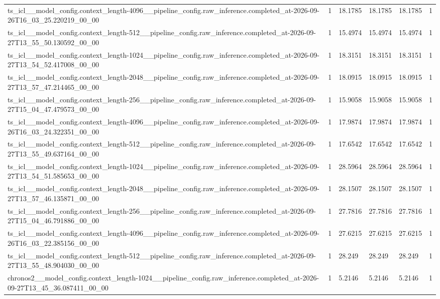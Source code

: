\begin{tabular}{llllll}
ts\_icl\_\_model\_config.context\_length-4096\_\_pipeline\_config.raw\_inference.completed\_at-2026-09-26T16\_03\_25.220219\_00\_00 & 1 & 18.1785 & 18.1785 & 18.1785 & 1 \\
ts\_icl\_\_model\_config.context\_length-512\_\_pipeline\_config.raw\_inference.completed\_at-2026-09-27T13\_55\_50.130592\_00\_00 & 1 & 15.4974 & 15.4974 & 15.4974 & 1 \\
ts\_icl\_\_model\_config.context\_length-1024\_\_pipeline\_config.raw\_inference.completed\_at-2026-09-27T13\_54\_52.417008\_00\_00 & 1 & 18.3151 & 18.3151 & 18.3151 & 1 \\
ts\_icl\_\_model\_config.context\_length-2048\_\_pipeline\_config.raw\_inference.completed\_at-2026-09-27T13\_57\_47.214465\_00\_00 & 1 & 18.0915 & 18.0915 & 18.0915 & 1 \\
ts\_icl\_\_model\_config.context\_length-256\_\_pipeline\_config.raw\_inference.completed\_at-2026-09-27T15\_04\_47.479573\_00\_00 & 1 & 15.9058 & 15.9058 & 15.9058 & 1 \\
ts\_icl\_\_model\_config.context\_length-4096\_\_pipeline\_config.raw\_inference.completed\_at-2026-09-26T16\_03\_24.322351\_00\_00 & 1 & 17.9874 & 17.9874 & 17.9874 & 1 \\
ts\_icl\_\_model\_config.context\_length-512\_\_pipeline\_config.raw\_inference.completed\_at-2026-09-27T13\_55\_49.637164\_00\_00 & 1 & 17.6542 & 17.6542 & 17.6542 & 1 \\
ts\_icl\_\_model\_config.context\_length-1024\_\_pipeline\_config.raw\_inference.completed\_at-2026-09-27T13\_54\_51.585653\_00\_00 & 1 & 28.5964 & 28.5964 & 28.5964 & 1 \\
ts\_icl\_\_model\_config.context\_length-2048\_\_pipeline\_config.raw\_inference.completed\_at-2026-09-27T13\_57\_46.135871\_00\_00 & 1 & 28.1507 & 28.1507 & 28.1507 & 1 \\
ts\_icl\_\_model\_config.context\_length-256\_\_pipeline\_config.raw\_inference.completed\_at-2026-09-27T15\_04\_46.791886\_00\_00 & 1 & 27.7816 & 27.7816 & 27.7816 & 1 \\
ts\_icl\_\_model\_config.context\_length-4096\_\_pipeline\_config.raw\_inference.completed\_at-2026-09-26T16\_03\_22.385156\_00\_00 & 1 & 27.6215 & 27.6215 & 27.6215 & 1 \\
ts\_icl\_\_model\_config.context\_length-512\_\_pipeline\_config.raw\_inference.completed\_at-2026-09-27T13\_55\_48.904030\_00\_00 & 1 & 28.249 & 28.249 & 28.249 & 1 \\
chronos2\_\_model\_config.context\_length-1024\_\_pipeline\_config.raw\_inference.completed\_at-2026-09-27T13\_45\_36.087411\_00\_00 & 1 & 5.2146 & 5.2146 & 5.2146 & 1 \\

\end{tabular}
